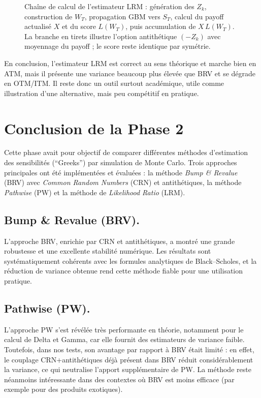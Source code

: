 \documentclass[a4paper,11pt]{article}
\begin{document}
\begin{figure}[H]
{
}

\caption{Chaîne de calcul de l’estimateur LRM : génération des \(Z_k\), construction de \(W_T\), propagation GBM vers \(S_T\), calcul du payoff actualisé \(X\) et du score \(L(W_T)\), puis accumulation de \(X\,L(W_T)\). La branche en tirets illustre l’option antithétique \((-Z_k)\) avec moyennage du payoff ; le score reste identique par symétrie.}
\label{fig:lrm_pipeline}
\end{figure}


\medskip
En conclusion, l’estimateur LRM est correct au sens théorique et marche bien en ATM, mais il présente une variance beaucoup plus élevée que BRV et se dégrade en OTM/ITM. Il reste donc un outil surtout académique, utile comme illustration d’une alternative, mais peu compétitif en pratique.

\section{Conclusion de la Phase 2}

Cette phase avait pour objectif de comparer différentes méthodes
d’estimation des sensibilités (``Greeks'') par simulation de Monte Carlo.
Trois approches principales ont été implémentées et évaluées : la méthode
\emph{Bump \& Revalue} (BRV) avec \emph{Common Random Numbers} (CRN) et
antithétiques, la méthode \emph{Pathwise} (PW) et la méthode de
\emph{Likelihood Ratio} (LRM).

\subsection{Bump \& Revalue (BRV).}
L’approche BRV, enrichie par CRN et antithétiques, a montré une grande
robustesse et une excellente stabilité numérique. Les résultats sont
systématiquement cohérents avec les formules analytiques de
Black--Scholes, et la réduction de variance obtenue rend cette méthode
fiable pour une utilisation pratique.

\subsection{Pathwise (PW).}
L’approche PW s’est révélée très performante en théorie, notamment pour
le calcul de Delta et Gamma, car elle fournit des estimateurs de variance
faible. Toutefois, dans nos tests, son avantage par rapport à BRV était
limité : en effet, le couplage CRN+antithétiques déjà présent dans BRV
réduit considérablement la variance, ce qui neutralise l’apport
supplémentaire de PW. La méthode reste néanmoins intéressante dans des
contextes où BRV est moins efficace (par exemple pour des produits exotiques).
\end{document}
